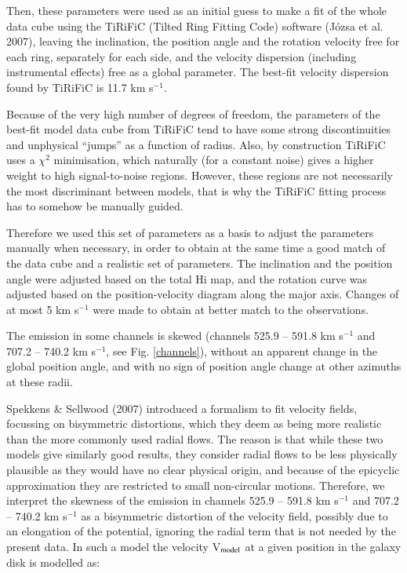 \documentclass[traditabstract]{aa}
\begin{document}
Then, these parameters were used as an initial guess to make 
a fit of the whole data cube using the TiRiFiC (Tilted Ring Fitting
Code) software
(J\'ozsa et al. 2007), leaving the inclination, the position angle and
the rotation velocity free for each ring, separately for each side,
and the velocity dispersion (including instrumental effects) free as a
global parameter. The best-fit velocity dispersion found by TiRiFiC is
11.7 km s$^{-1}$. 

Because of the very high number of degrees of freedom, the parameters
of the best-fit model data cube from TiRiFiC tend to have some strong
discontinuities and unphysical ``jumps'' as a function of radius. Also,
by construction TiRiFiC uses a $\chi^2$ minimisation, which naturally (for
a constant noise) gives a higher weight to high signal-to-noise
regions. However, these regions are not necessarily the most
discriminant between models, that is why the TiRiFiC fitting process
has to somehow be manually guided. 

Therefore we used this set of parameters as a basis to adjust the
parameters manually when necessary, in order to obtain at the same
time a good match of the data cube and a realistic set of
parameters. The inclination and the position angle were adjusted based
on the total H{\sc i} map, and the rotation curve was adjusted based on the
position-velocity diagram along the major axis. Changes of at most 5
km s$^{-1}$ were made to obtain at better match to the observations. 

The emission in some channels is skewed (channels 525.9 -- 591.8 km
s$^{-1}$ and 707.2 -- 740.2 km s$^{-1}$, see Fig. \ref{channels}),
without an apparent change in the 
global position angle, and with no sign of position angle change at
other azimuths at these radii. 

Spekkens \&
Sellwood (2007) 
introduced a formalism to fit velocity fields, focussing on
bisymmetric distortions, which they deem as being more realistic than
the more commonly used radial flows. The reason is that while these
two models give similarly good results, they consider radial flows to
be less
physically plausible as they would have no clear physical origin, and
because of the epicyclic approximation they are restricted to small
non-circular motions. Therefore, we interpret the skewness of the
emission in channels 525.9 -- 591.8 km s$^{-1}$ and 707.2 -- 740.2 km s$^{-1}$ as
a bisymmetric distortion of the velocity field, possibly due to an
elongation of the potential, ignoring the radial term that is not
needed by the present data. In such a model the velocity V$_{\rm model}$ at a
given position in the galaxy disk is modelled as:  
\end{document}
